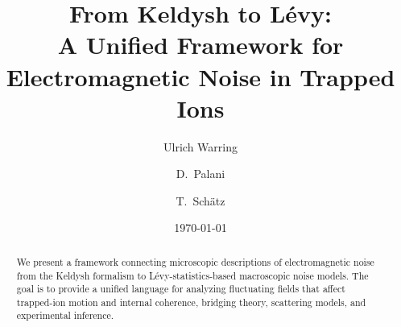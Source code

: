 \documentclass[11pt,a4paper]{article}
\title{From Keldysh to L\'evy:\\
  A Unified Framework for Electromagnetic Noise in Trapped Ions}
\author[1]{Ulrich Warring}
\author[1]{D.\ Palani}
\author[1]{T.\ Schätz}
\affil[1]{Physikalisches Institut, Universität Freiburg, Germany}
\date{\today}
\begin{document}
\maketitle

\begin{abstract}
We present a framework connecting microscopic descriptions of electromagnetic noise
from the Keldysh formalism to L\'evy-statistics-based macroscopic noise models.
The goal is to provide a unified language for analyzing fluctuating fields
that affect trapped-ion motion and internal coherence,
bridging theory, scattering models, and experimental inference.
\end{abstract}














\end{document}
